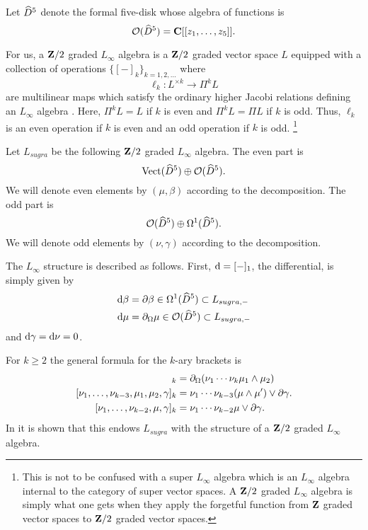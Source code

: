 \documentclass[11pt]{amsart}
\begin{document}
\parsec[s:e510]

Let $\Hat{D}^5$ denote the formal five-disk whose algebra of functions is 
\[
\cO(\Hat{D}^5) = \C[[z_1,\ldots,z_5]] .
\]

\parsec[s:L0]

For us, a $\Z/2$ graded $L_\infty$ algebra is a $\Z/2$ graded vector space $L$ equipped with a collection of operations $\{[-]_k\}_{k = 1,2,\ldots}$ where 
\[
\ell_k \colon L^{\times k} \to \Pi^k L 
\]
are multilinear maps which satisfy the ordinary higher Jacobi relations defining an $L_\infty$ algebra \cite{??}. 
Here, $\Pi^k L = L$ if $k$ is even and $\Pi^k L = \Pi L$ if $k$ is odd. 
Thus, $\ell_k$ is an even operation if $k$ is even and an odd operation if $k$ is odd. 
\footnote{This is not to be confused with a super $L_\infty$ algebra which is an $L_\infty$ algebra internal to the category of super vector spaces.
A $\Z/2$ graded $L_\infty$ algebra is simply what one gets when they apply the forgetful function from $\Z$ graded vector spaces to $\Z/2$ graded vector spaces.}

Let $L_{sugra}$ be the following $\Z/2$ graded $L_\infty$ algebra. 
The even part is 
\[
\Vect (\Hat{D}^5) \oplus \cO (\Hat{D}^5) .
\]
We will denote even elements by $(\mu, \beta)$ according to the decomposition. 
The odd part is 
\[
\cO(\Hat{D}^5) \oplus \Omega^1(\Hat{D}^5) .
\]
We will denote odd elements by $(\nu, \gamma)$ according to the decomposition. 

The $L_\infty$ structure is described as follows. 
First, $\d = [-]_1$, the differential, is simply given by 
\begin{align*}
\d \beta & = \del \beta \in \Omega^1(\Hat{D}^5) \subset L_{sugra,-} \\
\d \mu & = \div \mu \in \cO(\Hat{D}^5) \subset L_{sugra, -}
\end{align*}
and $\d \gamma = \d \nu = 0$. 

For $k \geq 2$ the general formula for the $k$-ary brackets is 
\begin{align*}
[\nu_1, \ldots, \nu_{k-2}, \mu_1,\mu_2]_{k} & = \div(\nu_1 \cdots \nu_k \mu_1 \wedge \mu_2) \\
[\nu_1,\ldots, \nu_{k-3}, \mu_1,\mu_2,\gamma]_k & = \nu_1 \cdots \nu_{k-3} (\mu \wedge \mu') \vee \del \gamma .\\
[\nu_1,\ldots,\nu_{k-2}, \mu, \gamma]_k & = \nu_1 \cdots \nu_{k-2} \mu \vee \del \gamma .
\end{align*}
In \cite{RSW} it is shown that this endows $L_{sugra}$ with the structure of a $\Z/2$ graded $L_\infty$ algebra.
\end{document}
